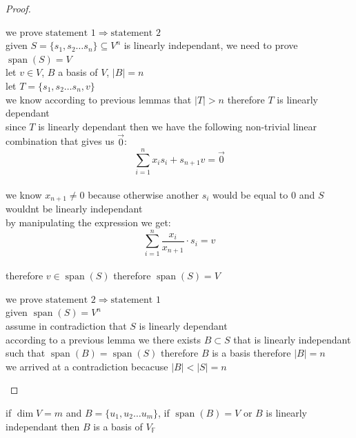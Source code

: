 \documentclass[a4paper,12pt]{article}
\DeclareMathOperator{\spn}{span}
\begin{document}
\begin{definition}
\begin{lemma}
\begin{proof}
\begin{step}
we prove \(\text{statement } 1 \Longrightarrow \text{statement } 2\)\\
given \(S = \{s_1,s_2\ldots s_n\} \subseteq V^n\) is linearly independant, we need to prove \(\spn(S) = V\)\\
let \(v \in V\), \(B\) a basis of \(V\), \(|B| = n\)\\
let \(T = \{s_1,s_2\ldots s_n, v\}\)\\
we know according to previous lemmas that \(|T| > n\) therefore \(T\) is linearly dependant\\
since \(T\) is linearly dependant then we have the following non-trivial linear combination that gives us \(\vec0\):\\
\[
  \sum_{i=1}^n x_is_i + s_{n+1}v = \vec0
\]\\
we know \(x_{n+1} \neq 0\) because otherwise another \(s_i\) would be equal to 0 and \(S\) wouldnt be linearly independant\\
by manipulating the expression we get:\\
\[
  \sum_{i=1}^n \frac{x_i}{x_{n+1}} \cdot s_i = v
\]\\
therefore \(v \in \spn(S)\) therefore \(\spn(S) = V\)\\
\end{step}

\begin{step}
we prove \(\text{statement } 2 \Longrightarrow \text{statement } 1\)\\
given \(\spn(S) = V^n\)\\
assume in contradiction that \(S\) is linearly dependant\\
according to a previous lemma we there exists \(B \subset S\) that is linearly independant such that \(\spn(B) = \spn(S)\) therefore \(B\) is a basis therefore \(|B| = n\)\\
we arrived at a contradiction becacuse \(|B| < |S| = n\)\\
\end{step}
\end{proof}

\begin{entailment}
if \(\dim V = m\) and \(B = \{u_1,u_2 \ldots u_m\}\), if \(\spn(B) = V\) or \(B\) is linearly independant then \(B\) is a basis of \(V_\mathbb{F}\)\\
\label{orgee4ccd8}
\end{entailment}
\end{lemma}


\end{definition}
\end{document}
